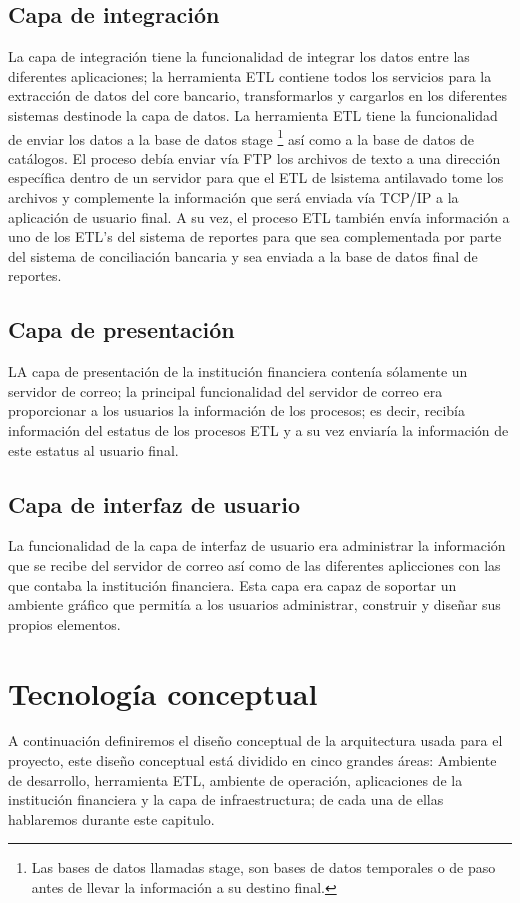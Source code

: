 \documentclass[a4paper,openright,12pt]{book}
\begin{document}
\subsection{Capa de integraci\'on}
La capa de integraci\'on tiene la funcionalidad de integrar los datos entre las diferentes aplicaciones; la herramienta ETL contiene todos los servicios para la extracci\'on de datos del core bancario, transformarlos y cargarlos en los diferentes sistemas destinode la capa de datos. La herramienta ETL tiene la funcionalidad de enviar los datos a la base de datos stage \footnote{Las bases de datos llamadas stage, son bases de datos temporales o de paso antes de llevar la informaci\'on a su destino final.} así como a la base de datos de cat\'alogos. El proceso deb\'ia enviar v\'ia FTP los archivos de texto a una direcci\'on espec\'ifica dentro de un servidor para que el ETL de lsistema antilavado tome los archivos y complemente la informaci\'on que ser\'a enviada v\'ia TCP/IP a la aplicaci\'on de usuario final. A su vez, el proceso ETL tambi\'en env\'ia informaci\'on a uno de los ETL's del sistema de reportes para que sea complementada por parte del sistema de conciliaci\'on bancaria y sea enviada a la base de datos final de reportes.

\subsection{Capa de presentaci\'on}
LA capa de presentaci\'on de la instituci\'on financiera conten\'ia s\'olamente un servidor de correo; la principal funcionalidad del servidor de correo era proporcionar a los usuarios la informaci\'on de los procesos; es decir, recib\'ia informaci\'on del estatus de los procesos ETL y a su vez enviar\'ia la informaci\'on de este estatus al usuario final.

\subsection{Capa de interfaz de usuario}
La funcionalidad de la capa de interfaz de usuario era administrar la informaci\'on que se recibe del servidor de correo as\'i como de las diferentes aplicciones con las que contaba la instituci\'on financiera. Esta capa era capaz de soportar un ambiente gr\'afico que permit\'ia a los usuarios administrar, construir y dise\~nar sus propios elementos. 

\section{Tecnolog\'ia conceptual}
A continuaci\'on definiremos el dise\~no conceptual de la arquitectura usada para el proyecto, este dise\~no conceptual est\'a dividido en cinco grandes \'areas: Ambiente de desarrollo, herramienta ETL, ambiente de operaci\'on, aplicaciones de la instituci\'on financiera y la capa de infraestructura; de cada una de ellas hablaremos durante este capitulo. 
\end{document}
